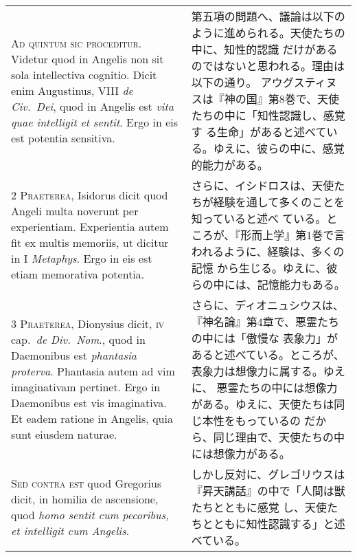 \documentclass[10pt]{jsarticle} %
\begin{document}
\begin{longtable}{p{21em}p{21em}}


{\huge A}{\scshape d quintum sic proceditur}. Videtur quod in
Angelis non sit sola intellectiva cognitio. Dicit enim Augustinus, VIII
{\itshape de Civ.~Dei}, quod in Angelis est {\itshape vita quae intelligit et sentit}. Ergo in
eis est potentia sensitiva.

&

第五項の問題へ、議論は以下のように進められる。天使たちの中に、知性的認識
 だけがあるのではないと思われる。理由は以下の通り。
アウグスティヌスは『神の国』第8巻で、天使たちの中に「知性認識し、感覚す
 る生命」があると述べている。ゆえに、彼らの中に、感覚的能力がある。


\\


{\scshape  2 Praeterea}, Isidorus dicit quod Angeli multa
noverunt per experientiam. Experientia autem fit ex multis memoriis, ut
dicitur in I {\itshape Metaphys}. Ergo in eis est etiam memorativa potentia.

&
さらに、イシドロスは、天使たちが経験を通して多くのことを知っていると述べ
 ている。ところが、『形而上学』第1巻で言われるように、経験は、多くの記憶
 から生じる。ゆえに、彼らの中には、記憶能力もある。

\\


{\scshape  3 Praeterea}, Dionysius dicit, {\scshape iv} cap.~{\itshape de
Div.~Nom}., quod in Daemonibus est {\itshape phantasia proterva}. Phantasia autem ad
vim imaginativam pertinet. Ergo in Daemonibus est vis imaginativa. Et
eadem ratione in Angelis, quia sunt eiusdem naturae.

&

さらに、ディオニュシウスは、『神名論』第4章で、悪霊たちの中には「傲慢な
 表象力」があると述べている。ところが、表象力は想像力に属する。ゆえに、
 悪霊たちの中には想像力がある。ゆえに、天使たちは同じ本性をもっているの
 だから、同じ理由で、天使たちの中には想像力がある。

\\


{\scshape Sed contra est} quod Gregorius dicit, in
homilia de ascensione, quod {\itshape homo sentit cum pecoribus, et intelligit cum
Angelis}.



&
しかし反対に、グレゴリウスは『昇天講話』の中で「人間は獣たちとともに感覚
 し、天使たちとともに知性認識する」と述べている。

\\




\end{longtable}
\end{document}
